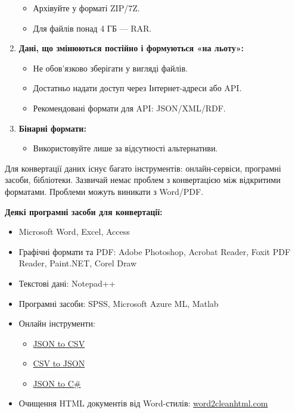 \begin{enumerate}
        \begin{itemize}
            \item Архівуйте у форматі ZIP/7Z.  
            \item Для файлів понад 4 ГБ — RAR.
        \end{itemize}
    \item \textbf{Дані, що змінюються постійно і формуються «на льоту»:}  
        \begin{itemize}
            \item Не обов'язково зберігати у вигляді файлів.  
            \item Достатньо надати доступ через Інтернет-адреси або API.  
            \item Рекомендовані формати для API: JSON/XML/RDF.
        \end{itemize}
    \item \textbf{Бінарні формати:}  
        \begin{itemize}
            \item Використовуйте лише за відсутності альтернативи.
        \end{itemize}
\end{enumerate}

Для конвертації даних існує багато інструментів: онлайн-сервіси, програмні засоби, бібліотеки. Зазвичай немає проблем з конвертацією між відкритими форматами. Проблеми можуть виникати з Word/PDF.

\textbf{Деякі програмні засоби для конвертації:}

\begin{itemize}
    \item Microsoft Word, Excel, Access
    \item Графічні формати та PDF: Adobe Photoshop, Acrobat Reader, Foxit PDF Reader, Paint.NET, Corel Draw
    \item Текстові дані: Notepad++
    \item Програмні засоби: SPSS, Microsoft Azure ML, Matlab
    \item Онлайн інструменти:  
        \begin{itemize}
            \item \href{http://konklone.io/json/}{JSON to CSV}  
            \item \href{http://www.convertcsv.com/csv-to-json.htm}{CSV to JSON}  
            \item \href{http://json2csharp.com/}{JSON to C\#}
        \end{itemize}
    \item Очищення HTML документів від Word-стилів: \href{https://word2cleanhtml.com/}{word2cleanhtml.com}
\end{itemize}

